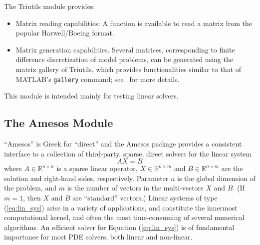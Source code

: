 \documentclass[acmtocl]{acmtrans2m}
\begin{document}
The Triutils module provides:
\begin{itemize}

\item Matrix reading capabilities: A function is available to read a
  matrix from the popular Harwell/Boeing format.

\item Matrix generation capabilities.  Several matrices, corresponding
  to finite difference discretization of model problems, can be
  generated using the matrix gallery of Triutils, which provides
  functionalities similar to that of MATLAB's {\tt gallery} command;
  see~\cite[Chapter 5]{Trilinos-tutorial} for more details.

\end{itemize}

This module is intended mainly for testing linear solvers.

\subsection{The Amesos Module}
\label{subsec:amesos}

``Amesos'' is Greek for ``direct'' and the Amesos package provides a
consistent interface to a collection of third-party, sparse, direct
solvers for the linear system
\begin{equation}
  \label{eq:lin_sys}
  A X = B
\end{equation}
where $A \in \mathbb{R}^{n \times n}$ is a sparse linear operator, $X
\in \mathbb{R}^{n \times m}$ and $B \in \mathbb{R}^{n \times m}$ are
the solution and right-hand sides, respectively.  Parameter $n$ is the
global dimension of the problem, and $m$ is the number of vectors in
the multi-vectors $X$ and $B$.  (If $m = 1$, then $X$ and $B$ are
``standard'' vectors.)  Linear systems of type (\ref{eq:lin_sys})
arise in a variety of applications, and constitute the innermost
computational kernel, and often the most time-consuming of several
numerical algorithms.  An efficient solver for Equation
(\ref{eq:lin_sys}) is of fundamental importance for most PDE solvers,
both linear and non-linear.

\smallskip
\end{document}
